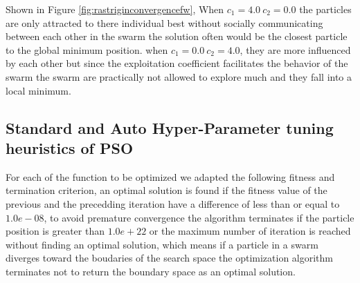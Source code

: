 \documentclass[
]{article}
\begin{document}
Shown in Figure \ref{fig:rastriginconvergencefw}, When
\(c_1=4.0\: c_2=0.0\) the particles are only attracted to there
individual best without socially communicating between each other in the
swarm the solution often would be the closest particle to the global
minimum position. when \(c_1=0.0\: c_2=4.0\), they are more influenced
by each other but since the exploitation coefficient facilitates the
behavior of the swarm the swarm are practically not allowed to explore
much and they fall into a local minimum.

\newpage

\hypertarget{standard-and-auto-hyper-parameter-tuning-heuristics-of-pso}{%
\subsection{Standard and Auto Hyper-Parameter tuning heuristics of
PSO}\label{standard-and-auto-hyper-parameter-tuning-heuristics-of-pso}}

For each of the function to be optimized we adapted the following
fitness and termination criterion, an optimal solution is found if the
fitness value of the previous and the precedding iteration have a
difference of less than or equal to \(1.0e-08\), to avoid premature
convergence the algorithm terminates if the particle position is greater
than \(1.0e+22\) or the maximum number of iteration is reached without
finding an optimal solution, which means if a particle in a swarm
diverges toward the boudaries of the search space the optimization
algorithm terminates not to return the boundary space as an optimal
solution.
\end{document}
